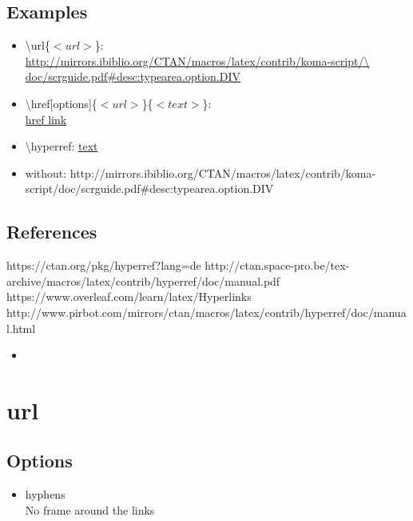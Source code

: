 \subsection{Examples}
\begin{itemize}
    \item{\textbackslash url\{$<url>$\}:\\
        \url{http://mirrors.ibiblio.org/CTAN/macros/latex/contrib/koma-script/\
        doc/scrguide.pdf\#desc:typearea.option.DIV}}
    \item{\textbackslash href[options]\{$<url>$\}\{$<text>$\}:\\
        \href{http://mirrors.ibiblio.org/CTAN/macros/latex/contrib/koma-script/doc/scrguide.pdf\#desc:typearea.option.DIV}{href link}}
    \item{\textbackslash hyperref: \hyperref{http://mirrors.ibiblio.org/CTAN/macros/latex/contrib/koma-script/doc/scrguide.pdf\#desc:typearea.option.DIV}{category}{name}{text}}
    \item{without: http://mirrors.ibiblio.org/CTAN/macros/latex/contrib/koma-script/doc/scrguide.pdf\#desc:typearea.option.DIV}
\end{itemize}
\subsection{References}
https://ctan.org/pkg/hyperref?lang=de
http://ctan.space-pro.be/tex-archive/macros/latex/contrib/hyperref/doc/manual.pdf
https://www.overleaf.com/learn/latex/Hyperlinks
http://www.pirbot.com/mirrors/ctan/macros/latex/contrib/hyperref/doc/manual.html
\begin{itemize}
    \item{}
\end{itemize}

\section{url}
\subsection{Options}
\begin{itemize}
    \item{hyphens\\
        No frame around the links}
\end{itemize}
